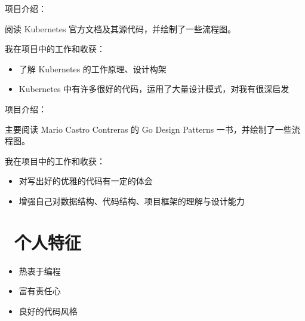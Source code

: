 \documentclass{resume}
\begin{document}

\vspace{1mm}\par
\noindent
项目介绍：

\vspace{1mm}\par
\setlength{\parindent}{2ex}
阅读 Kubernetes 官方文档及其源代码，并绘制了一些流程图。

\vspace{1mm}\par
\noindent
我在项目中的工作和收获：

\begin{itemize}[parsep=1ex]
	\item 了解 Kubernetes 的工作原理、设计构架
	\item Kubernetes 中有许多很好的代码，运用了大量设计模式，对我有很深启发
\end{itemize}


\vspace{1mm}\par
\noindent
项目介绍：

\vspace{1mm}\par
\setlength{\parindent}{2ex}
主要阅读 Mario Castro Contreras 的 Go Design Patterns 一书，并绘制了一些流程图。

\vspace{1mm}\par
\noindent

我在项目中的工作和收获：
\begin{itemize}[parsep=1ex]
	\item 对写出好的优雅的代码有一定的体会
	\item 增强自己对数据结构、代码结构、项目框架的理解与设计能力
\end{itemize}

\section{\faUser\ 个人特征} \vspace{1mm}

\begin{itemize}[parsep=1ex]
	\item 热衷于编程
	\item 富有责任心
	\item 良好的代码风格
\end{itemize}
\end{document}
